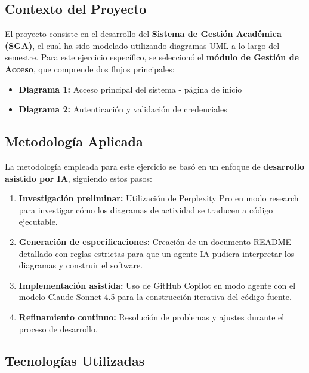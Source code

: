 \documentclass[11pt,a4paper]{article}
\begin{document}
\subsection{Contexto del Proyecto}

El proyecto consiste en el desarrollo del \textbf{Sistema de Gestión Académica (SGA)}, el cual ha sido modelado utilizando diagramas UML a lo largo del semestre. Para este ejercicio específico, se seleccionó el \textbf{módulo de Gestión de Acceso}, que comprende dos flujos principales:

\begin{itemize}
    \item \textbf{Diagrama 1:} Acceso principal del sistema - página de inicio
    \item \textbf{Diagrama 2:} Autenticación y validación de credenciales
\end{itemize}

\subsection{Metodología Aplicada}

La metodología empleada para este ejercicio se basó en un enfoque de \textbf{desarrollo asistido por IA}, siguiendo estos pasos:

\begin{enumerate}
    \item \textbf{Investigación preliminar:} Utilización de Perplexity Pro en modo research para investigar cómo los diagramas de actividad se traducen a código ejecutable.
    
    \item \textbf{Generación de especificaciones:} Creación de un documento README detallado con reglas estrictas para que un agente IA pudiera interpretar los diagramas y construir el software.
    
    \item \textbf{Implementación asistida:} Uso de GitHub Copilot en modo agente con el modelo Claude Sonnet 4.5 para la construcción iterativa del código fuente.
    
    \item \textbf{Refinamiento continuo:} Resolución de problemas y ajustes durante el proceso de desarrollo.
\end{enumerate}

\subsection{Tecnologías Utilizadas}
\end{document}
